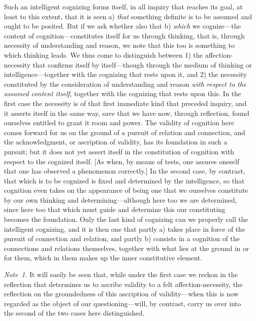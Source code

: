 \documentclass[12pt,a4paper]{book}
\begin{document}
Such an intelligent cognizing forms itself, in all inquiry that reaches its goal,
at least to this extent, that it is seen a) \emph{that} something definite is to
be assumed and ought to be posited. But if we ask whether also that b)
\emph{which} we cognize---the content of cognition---constitutes itself for us
through thinking, that is, through necessity of understanding and reason, we note
that this too is something to which thinking leads. We thus come to distinguish
between 1) the affection-necessity that confirms itself by itself---though through
the medium of thinking or intelligence---together with the cognizing that rests
upon it, and 2) the necessity constituted by the consideration of understanding
and reason \emph{with respect to the assumed content itself}, together with the
cognizing that rests upon this. In the first case the necessity is of that first
immediate kind that preceded inquiry, and it asserts itself in the same way, save
that we have now, through reflection, found ourselves entitled to grant it room
and power. The validity of cognition here comes forward for us on the ground of a
pursuit of relation and connection, and the acknowledgment, or ascription of
validity, has its foundation in such a pursuit; but it does not yet assert itself
in the constitution of cognition with respect to the cognized itself. [As when,
by means of tests, one assures oneself that one has observed a phenomenon
correctly.] In the second case, by contrast, that which is to be cognized is
fixed and determined by the intelligence, so that cognition even takes on the
appearance of being one that we ourselves constitute by our own thinking and
determining---although here too we are determined, since here too that which must
guide and determine this our constituting becomes the foundation. Only the last
kind of cognizing can we properly call the intelligent cognizing, and it is then
one that partly a) takes place in force of the pursuit of connection and relation,
and partly b) consists in a cognition of the connections and relations
themselves, together with what lies at the ground in or for them, which in them
makes up the inner constitutive element.

{\small\emph{Note~1.} It will easily be seen that, while under the first case we
reckon in the reflection that determines us to ascribe validity to a felt
affection-necessity, the reflection on the groundedness of this ascription of
validity---when this is now regarded as the object of our questioning---will, by
contrast, carry us over into the second of the two cases here distinguished.\par}
\end{document}
